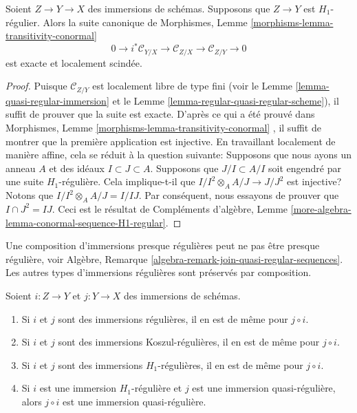 \begin{lemma}
\label{lemma-transitivity-conormal-quasi-regular}
Soient  $Z \to Y \to X$  des immersions de schémas. Supposons que  $Z \to Y$  est
 $H_1$-régulier. Alors la suite canonique de Morphismes, Lemme  \ref{morphisms-lemma-transitivity-conormal}
$$
0 \to i^*\mathcal{C}_{Y/X} \to
\mathcal{C}_{Z/X} \to
\mathcal{C}_{Z/Y} \to 0
$$
est exacte et localement scindée.
\end{lemma}

\begin{proof}
Puisque  $\mathcal{C}_{Z/Y}$  est localement libre de type fini (voir le Lemme  \ref{lemma-quasi-regular-immersion} 
et le Lemme  \ref{lemma-regular-quasi-regular-scheme}), il suffit de prouver que la suite est exacte. D'après
ce qui a été prouvé dans Morphismes, Lemme  \ref{morphisms-lemma-transitivity-conormal} , il suffit de montrer que
la première application est injective. En travaillant localement de manière
affine, cela se réduit à la question suivante: Supposons que nous ayons un anneau
 $A$  et des idéaux  $I \subset J \subset A$. Supposons que  $J/I \subset A/I$  soit engendré
par une suite  $H_1$-régulière. Cela implique-t-il que  $I/I^2 \otimes_A A/J \to J/J^2$  est
injective? Notons que  $I/I^2 \otimes_A A/J = I/IJ$. Par conséquent, nous essayons de prouver que
 $I \cap J^2 = IJ$. Ceci est le résultat de Compléments d'algèbre, Lemme  \ref{more-algebra-lemma-conormal-sequence-H1-regular}.
\end{proof}

\noindent
Une composition d'immersions presque régulières peut ne pas être presque
régulière, voir Algèbre, Remarque  \ref{algebra-remark-join-quasi-regular-sequences}. Les autres types d'immersions
régulières sont préservés par composition.

\begin{lemma}
\label{lemma-composition-regular-immersion}
Soient  $i : Z \to Y$  et  $j : Y \to X$  des immersions de schémas.
\begin{enumerate}
\item Si  $i$  et  $j$  sont des immersions régulières, il en est de même
pour  $j \circ i$.
\item Si  $i$  et  $j$  sont des immersions Koszul-régulières, il en est
de même pour  $j \circ i$.
\item Si  $i$  et  $j$  sont des immersions  $H_1$-régulières, il en
est de même pour  $j \circ i$.
\item Si  $i$  est une immersion  $H_1$-régulière et  $j$  est une
immersion quasi-régulière, alors  $j \circ i$  est une immersion quasi-régulière.
\end{enumerate}
\end{lemma}

